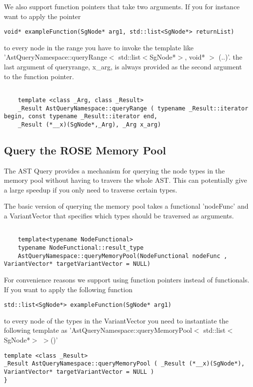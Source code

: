 We also support function pointers that take two arguments. If you for instance want to apply the pointer
\begin{verbatim}
void* exampleFunction(SgNode* arg1, std::list<SgNode*> returnList) 
\end{verbatim}
to every node in the range you have to invoke the template like 'AstQueryNamespace::queryRange$<$ std::list$<$SgNode*$>$, void* $>$ (..)'.
the last argument of queryrange, x\_arg, is always provided as the second argument to the function pointer.
\begin{verbatim}

    template <class _Arg, class _Result> 
    _Result AstQueryNamespace::queryRange ( typename _Result::iterator begin, const typename _Result::iterator end,
	_Result (*__x)(SgNode*,_Arg), _Arg x_arg)
\end{verbatim}

\subsection{Query the ROSE Memory Pool}

The AST Query provides a mechanism for querying the node types in the memory pool without having to travers
the whole AST. This can potentially give a large speedup if you only need to traverse certain types.

The basic version of querying the memory pool takes a functional 'nodeFunc' and a VariantVector that specifies
which types should be traversed as arguments.
\begin{verbatim}

    template<typename NodeFunctional>
    typename NodeFunctional::result_type 
    AstQueryNamespace::queryMemoryPool(NodeFunctional nodeFunc , VariantVector* targetVariantVector = NULL)
 \end{verbatim}

For convenience reasons we support using function pointers instead of functionals. If you want to apply the
following function
\begin{verbatim}
std::list<SgNode*> exampleFunction(SgNode* arg1) 
\end{verbatim}
to every node of the types in the VariantVector you need to instantiate the following template as
'AstQueryNamespace::queryMemoryPool$<$ std::list$<$SgNode*$>$  $>$()'

\begin{verbatim}
template <class _Result> 
_Result AstQueryNamespace::queryMemoryPool ( _Result (*__x)(SgNode*), VariantVector* targetVariantVector = NULL )
}
\end{verbatim}

